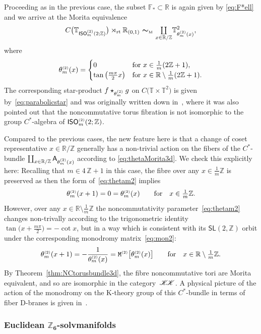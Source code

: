 \documentclass[pdftex]{sigma}
\numberwithin{equation}{section}
\newcommand{\Z}{\zed}
\newcommand{\F}{\mathbb{F}}
\newcommand{\mbf}[1]{{\boldsymbol {#1} }}
\def\A{{\sf A}}
\newcommand{\CCK}{\mathscr{K}}
\newcommand{\sfSL}{\mathsf{SL}}
\newcommand{\ISO}{{\sf ISO}}
\newcommand{\rt}{{\rm rt}}
\newcommand{\mcoprod}{\mbox{$\coprod\limits_{x\in\R/\Z}$}}
\newcommand{\R}{\real}
\newcommand{\zed}{{\mathbb Z}} %
\newcommand{\real}{{\mathbb R}} %
\newcommand{\torus}{{\mathbb T}} %
\begin{document}
Proceeding as in the previous
case, the subset $\F_*\subset\R$ is again given by \eqref{eq:F*ell} and we arrive at the Morita equivalence
\[
C\big(\torus_{\ISO^{\text{\tiny($2$)}}_m(2;\Z)}\big)\rtimes_\rt\real_{(0,1)}
\ \mbf\sim_{\text{\tiny M}} \ \mcoprod
\torus^2_{\theta^{\text{\tiny(2)}}_m(x)} ,
\]
where
\begin{gather}\label{eq:thetam2}
\theta_m^{\text{\tiny(2)}}(x) = \begin{cases}
 0 &\mbox{for} \ x \in \frac1{m} (2 \Z+1) , \\
 \tan\big(\frac{m \pi}2 x\big)
 & \mbox{for} \ x\in\R\setminus \frac1{m} (2 \Z+1) . \end{cases}
\end{gather}
The corresponding star-product
$f\star_{\theta_m^{\text{\tiny(2)}}}g$ on $C\big(\torus\times\torus^2\big)$
is given by~\eqref{eq:parabolicstar} and was originally written down
in~\cite{Hull2019}, where it was also pointed out that the
noncommutative torus fibration is not isomorphic to the group
$C^*$-algebra of $\ISO_m^{\text{\tiny(2)}}(2;\Z)$.

Compared to the previous cases, the new feature here is that a change of coset
representative $x\in\R/\Z$ generally has a
non-trivial action on the fibers of the $C^*$-bundle $\coprod_{x\in\R/\Z}
\A_{\theta_m^{\text{\tiny(2)}}(x)}$ according to
\eqref{eq:thetaMorita3d}. We check this explicitly here: Recalling that $m\in 4\,\Z+1$ in
 this case, the fibre over any $x\in\frac1m \Z$ is preserved
 as then the form of~\eqref{eq:thetam2} implies
\[
\theta_m^{\text{\tiny(2)}}(x+1) =
 0=\theta_m^{\text{\tiny(2)}}(x)
\qquad \mbox{for} \quad x\in\tfrac1m \Z .
\]
However,
 over any $x\in\R\setminus\frac1m \Z$ the noncommutativity parameter~\eqref{eq:thetam2} changes non-trivally according to the
 trigonometric identity $\tan\big(x+\frac{m \pi}2\big)=-\cot x$, but in a way which is
 consistent with its $\sfSL(2,\Z)$ orbit under the corresponding
 monodromy matrix~\eqref{eq:mon2}:
\[
\theta_m^{\text{\tiny(2)}}(x+1) = -\frac1{\theta_m^{\text{\tiny(2)}}(x)} =
{\tt M}^{\text{\tiny(2)}}\big[\theta_m^{\text{\tiny(2)}}(x)\big]
\qquad \mbox{for} \quad x\in\R\setminus\tfrac1m \Z .
\]
By Theorem~\ref{thm:NCtorusbundle3d}, the fibre noncommutative tori are Morita
equivalent, and so are isomorphic in the
category~${\CCK\hspace{-1mm}\CCK}$. A physical picture of the action
of the monodromy on the K-theory group of this $C^*$-bundle in terms
of fiber D-branes is given in~\cite{Hull2019}.

\subsubsection*{Euclidean $\boldsymbol{\Z_6}$-solvmanifolds}
\end{document}
